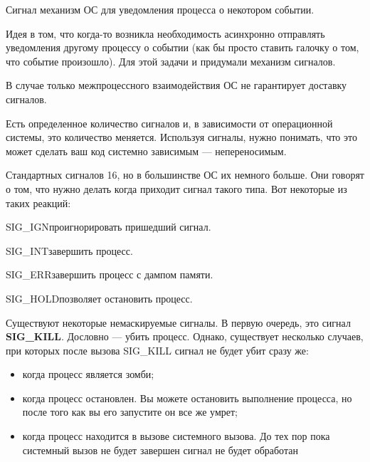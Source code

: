 \begin{defi}{Сигнал}
	механизм ОС для уведомления процесса о некотором событии. 
\end{defi}

Идея в том, что когда-то возникла необходимость асинхронно отправлять уведомления другому процессу о событии (как бы просто ставить галочку о том, что событие произошло). Для этой задачи и придумали механизм сигналов. 

В случае только межпроцессного взаимодействия ОС не гарантирует доставку сигналов. 

Есть определенное количество сигналов и, в зависимости от операционной системы, это количество меняется. Используя сигналы, нужно понимать, что это может сделать ваш код системно зависимым --- непереносимым.

Стандартных сигналов 16, но в большинстве ОС их немного больше. Они говорят о том, что нужно делать когда приходит сигнал такого типа. Вот некоторые из таких реакций:

\begin{myenv}{SIG\_IGN}{проигнорировать пришедший сигнал.} 
\end{myenv}

\begin{myenv}{SIG\_INT}{завершить процесс.} 
\end{myenv}
	
\begin{myenv}{SIG\_ERR}{завершить процесс с дампом памяти.}
\end{myenv}
	
\begin{myenv}{SIG\_HOLD}{позволяет остановить процесс.}
\end{myenv}

Существуют некоторые немаскируемые сигналы. В первую очередь, это сигнал \textbf{SIG\_KILL}. Дословно --- убить процесс. Однако, существует несколько случаев, при которых после вызова SIG\_KILL сигнал не будет убит сразу же:

\begin{itemize}
	\item когда процесс является зомби;

	\item когда процесс остановлен. Вы можете остановить выполнение процесса, но после того как вы его запустите он все же умрет;

	\item когда процесс находится в вызове системного вызова. До тех пор пока системный вызов не будет завершен сигнал не будет обработан
\end{itemize}

